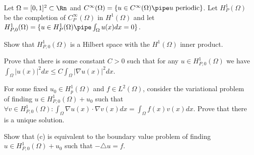Let $\Omega=[0,1]^2\subset \Rn$ and $C^{\infty}(\Omega)=\{u\in
C^{\infty}(\Omega) \pipe u \mathrm{\ periodic}\}$. Let $H^1_P(\Omega)$
be the completion of $C^{\infty}_P(\Omega)$ in $H^1(\Omega)$ and let
$H^1_{P,0}(\Omega)=\{u\in H^1_P(\Omega) \pipe \int_{\Omega}u(x)dx=0\}$.
\begin{alist}
\item Show that $H_{P,0}^1(\Omega)$ is a Hilbert space with the
$H^1(\Omega)$ inner product.
\item Prove that there is some constant $C>0$ such that for any $u\in
H^1_{P,0}(\Omega)$ we have $\int_{\Omega}|u(x)|^2 dx\leq
C\int_{\Omega} |\nabla u(x)|^2 dx$.
\item For some fixed $u_0\in H^1_p(\Omega)$ and $f\in L^2(\Omega)$,
consider the variational problem of finding $u\in
H^1_{P,0}(\Omega)+u_0$ such that $\forall v\in H^1_{P,0}(\Omega):
\int_{\Omega}\nabla u(x)\cdot \nabla v(x)dx =\int_{\Omega}f(x)v(x)dx$.
Prove that there is a unique solution.
\item Show that (c) is equivalent to the boundary value problem of
finding $u\in H^1_{P,0}(\Omega)+u_0$ such that $-\triangle u=f$.
\end{alist}

